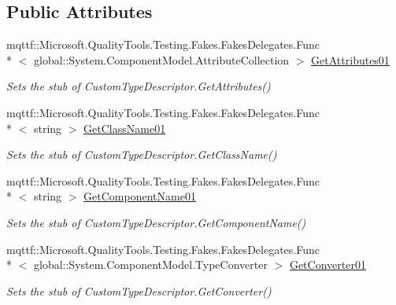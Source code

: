 \subsection*{Public Attributes}
\begin{DoxyCompactItemize}
\item 
mqttf\-::\-Microsoft.\-Quality\-Tools.\-Testing.\-Fakes.\-Fakes\-Delegates.\-Func\\*
$<$ global\-::\-System.\-Component\-Model.\-Attribute\-Collection $>$ \hyperlink{class_system_1_1_component_model_1_1_fakes_1_1_stub_custom_type_descriptor_acab6c28b14b8d81fc27ec14fa7fefae7}{Get\-Attributes01}
\begin{DoxyCompactList}\small\item\em Sets the stub of Custom\-Type\-Descriptor.\-Get\-Attributes()\end{DoxyCompactList}\item 
mqttf\-::\-Microsoft.\-Quality\-Tools.\-Testing.\-Fakes.\-Fakes\-Delegates.\-Func\\*
$<$ string $>$ \hyperlink{class_system_1_1_component_model_1_1_fakes_1_1_stub_custom_type_descriptor_a1048a28d7fadbd3aeb351297a4f4a4cb}{Get\-Class\-Name01}
\begin{DoxyCompactList}\small\item\em Sets the stub of Custom\-Type\-Descriptor.\-Get\-Class\-Name()\end{DoxyCompactList}\item 
mqttf\-::\-Microsoft.\-Quality\-Tools.\-Testing.\-Fakes.\-Fakes\-Delegates.\-Func\\*
$<$ string $>$ \hyperlink{class_system_1_1_component_model_1_1_fakes_1_1_stub_custom_type_descriptor_a8809ed49afda696d0256fd384233e8d6}{Get\-Component\-Name01}
\begin{DoxyCompactList}\small\item\em Sets the stub of Custom\-Type\-Descriptor.\-Get\-Component\-Name()\end{DoxyCompactList}\item 
mqttf\-::\-Microsoft.\-Quality\-Tools.\-Testing.\-Fakes.\-Fakes\-Delegates.\-Func\\*
$<$ global\-::\-System.\-Component\-Model.\-Type\-Converter $>$ \hyperlink{class_system_1_1_component_model_1_1_fakes_1_1_stub_custom_type_descriptor_a38be930ded249613dbd1d02e4597b21f}{Get\-Converter01}
\begin{DoxyCompactList}\small\item\em Sets the stub of Custom\-Type\-Descriptor.\-Get\-Converter()\end{DoxyCompactList}\item 

\end{DoxyCompactItemize}
